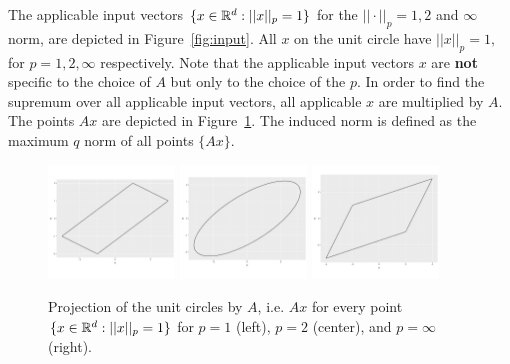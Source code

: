 \documentclass{article}
\begin{document}
The applicable input vectors $\{x \in \mathbb{R}^d: ||x||_p = 1\}$ for the $||\cdot||_p = 1, 2$ and $\infty$ norm, are depicted in Figure~\ref{fig:input}. All $x$ on the unit circle have $||x||_p = 1,$ for $p = 1, 2, \infty$ respectively. Note that the applicable input vectors $x$ are \textbf{not} specific to the choice of $A$ but only to the choice of the $p$.
In order to find the supremum over all applicable input vectors, all applicable $x$ are  multiplied by $A$. The points $Ax$ are depicted in Figure~\ref{fig:output}. The induced norm is defined as the maximum $q$ norm of all points $\{Ax\}$.



\begin{figure}[ht]
    \centering
    \includegraphics[width=0.3\textwidth]{A_unit_circle_1.pdf}
    \includegraphics[width=0.3\textwidth]{A_unit_circle_2.pdf}
    \includegraphics[width=0.3\textwidth]{A_unit_circle_inf.pdf}
    \caption{Projection of the unit circles by $A$, i.e. $Ax$ for every point $\{x \in \mathbb{R}^d: ||x||_p = 1\}$ for $p = 1$ (left), $p = 2$ (center), and $p = \infty$ (right).}
    \label{fig:output}
\end{figure}
\end{document}
